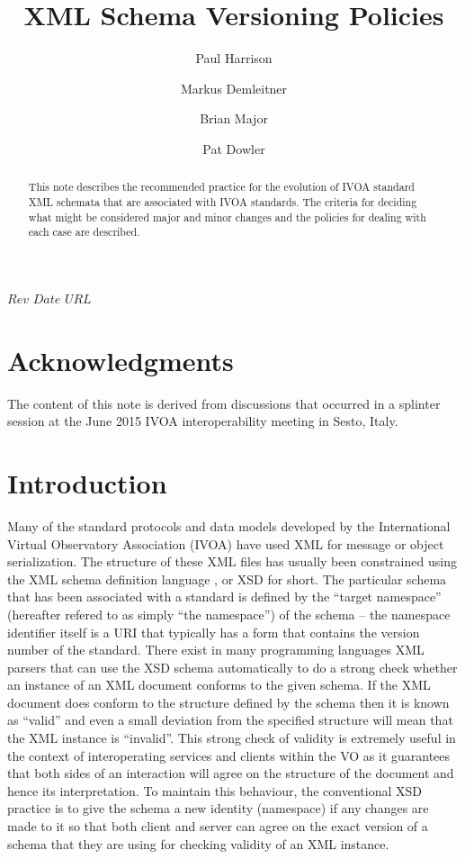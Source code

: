 \documentclass[10pt,a4paper]{ivoa}
\title{XML Schema Versioning Policies}
\author[http://www.ivoa.net/cgi-bin/twiki/bin/view/IVOA/PaulHarrison]{Paul Harrison}
\author[http://www.ivoa.net/cgi-bin/twiki/bin/view/IVOA/MarkusDemleitner]{Markus Demleitner}
\author[http://www.ivoa.net/cgi-bin/twiki/bin/view/IVOA/BrianMajor]{Brian Major}
\author[http://www.ivoa.net/cgi-bin/twiki/bin/view/IVOA/PatDowler]{Pat Dowler}
\begin{document}
\SVN$Rev$
\SVN$Date$
\SVN$URL$

\begin{abstract}
This note describes the recommended practice for the evolution of IVOA
standard XML schemata that are associated with IVOA standards.  The criteria for
deciding what might be considered major and minor changes and the policies for dealing with each case are described.
\end{abstract}



\section*{Acknowledgments}

The content of this note is derived from discussions that occurred in a splinter
session at the June 2015 IVOA interoperability meeting in Sesto, Italy.

\section{Introduction}

Many of the standard protocols and data models developed by
the International Virtual Observatory Association (IVOA) have used XML
\citep{std:XML} for message or object serialization. The structure of
these XML files has
usually been constrained using the XML schema definition language
\citep{std:XSD}, or XSD for short.
The particular schema that has been associated with a standard 
is defined by the ``target namespace'' (hereafter refered to as simply ``the
namespace'') of the schema -- the namespace identifier itself is a URI that
typically has a form that contains the version number of the standard. There
exist in many programming languages XML parsers that can use the XSD schema
automatically to do a strong check whether an instance of an XML
document conforms to the given schema. If the XML document does conform to the
structure defined by the schema then it is known as ``valid'' and even a small
deviation from the specified structure will mean that the XML instance is
``invalid''. This strong check of validity is extremely useful in the context of
interoperating services and clients within the VO as it guarantees that both
sides of an interaction will agree on the structure of the document and
hence its interpretation. To maintain
this behaviour, the conventional XSD practice is to give the schema a new
identity (namespace) if any changes are made to it so that both client and
server can agree on the exact version of a schema that they are using for
checking validity of an XML instance.
\end{document}
